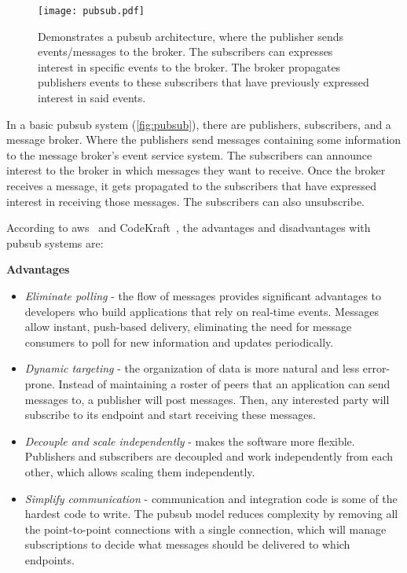 \vspace{1.5cm}
\begin{figure}[ht]
    \centering
    \texttt{[image: pubsub.pdf]}
    \caption[Architecture - \acl{pubsub}]{Demonstrates a \acl{pubsub} architecture, where the publisher sends events/messages to the broker. The subscribers can expresses interest in specific events to the broker. The broker propagates publishers events to these subscribers that have previously expressed interest in said events.}
    \label{fig:pubsub}
\end{figure}
\vspace{1.5cm}

In a basic \ac{pubsub} system (\autoref{fig:pubsub}), there are publishers, subscribers, and a message broker. Where the publishers send messages containing some information to the message broker's event service system. The subscribers can announce interest to the broker in which messages they want to receive. Once the broker receives a message, it gets propagated to the subscribers that have expressed interest in receiving those messages. The subscribers can also unsubscribe.

\newpage
According to \ac{aws}~\cite{aws_benefit} and CodeKraft~\cite{pubsub_codekraft}, the advantages and disadvantages with \ac{pubsub} systems are:

\textbf{Advantages}
\begin{itemize}
    \item \emph{Eliminate polling} - the flow of messages provides significant advantages to developers who build applications that rely on real-time events. Messages allow instant, push-based delivery, eliminating the need for message consumers to poll for new information and updates periodically.
    
    \item \emph{Dynamic targeting} - the organization of data is more natural and less error-prone. Instead of maintaining a roster of peers that an application can send messages to, a publisher will post messages. Then, any interested party will subscribe to its endpoint and start receiving these messages.
    
    \item \emph{Decouple and scale independently} - makes the software more flexible. Publishers and subscribers are decoupled and work independently from each other, which allows scaling them independently.
    
    \item \emph{Simplify communication} - communication and integration code is some of the hardest code to write. The \ac{pubsub} model reduces complexity by removing all the point-to-point connections with a single connection, which will manage subscriptions to decide what messages should be delivered to which endpoints.
\end{itemize}


